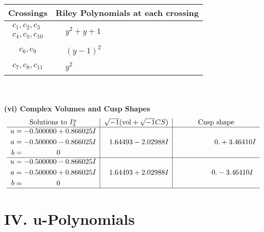 \documentclass[1p]{elsarticle_modified}
\theoremstyle{definition}
\newcommand{\I}{\sqrt{-1}}
\begin{document}
\begin{tabular}{m{50pt}|m{274pt}}
Crossings & \hspace{64pt}Riley Polynomials at each crossing \\
\hline $$\begin{aligned}c_{1},c_{2},c_{3}\\c_{4},c_{5},c_{10}\end{aligned}$$&$\begin{aligned}
&y^2+y+1
\end{aligned}$\\
\hline $$\begin{aligned}c_{6},c_{9}\end{aligned}$$&$\begin{aligned}
&(y-1)^2
\end{aligned}$\\
\hline $$\begin{aligned}c_{7},c_{8},c_{11}\end{aligned}$$&$\begin{aligned}
&y^2
\end{aligned}$\\
\hline
\end{tabular}\\~\\
\newpage\flushleft \textbf{(vi) Complex Volumes and Cusp Shapes}
$$\begin{array}{c|c|c}  
\text{Solutions to }I^u_{3}& \I (\text{vol} + \sqrt{-1}CS) & \text{Cusp shape}\\
 \hline 
\begin{aligned}
u &= -0.500000 + 0.866025 I \\
a &= -0.500000 - 0.866025 I \\
b &= \phantom{-0.000000 } 0\end{aligned}
 & \phantom{-}1.64493 - 2.02988 I & \phantom{-0.000000 -}0. + 3.46410 I \\ \hline\begin{aligned}
u &= -0.500000 - 0.866025 I \\
a &= -0.500000 + 0.866025 I \\
b &= \phantom{-0.000000 } 0\end{aligned}
 & \phantom{-}1.64493 + 2.02988 I & \phantom{-0.000000 } 0. - 3.46410 I\\
 \hline 
 \end{array}$$\newpage
\newpage\renewcommand{\arraystretch}{1}
\centering \section*{ IV. u-Polynomials}
\end{document}
